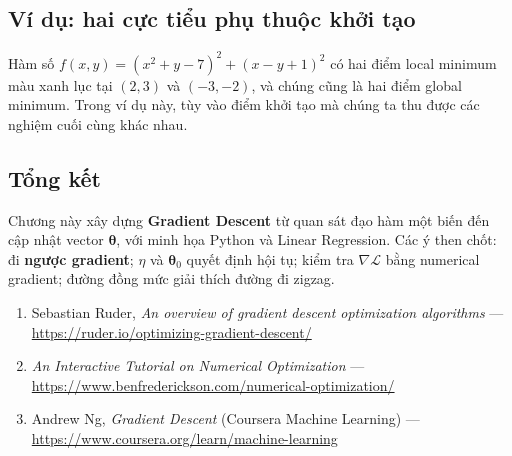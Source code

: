 \subsection{Ví dụ: hai cực tiểu phụ thuộc khởi tạo}

\begin{vidu}[title={Hàm $f(x,y) = (x^2 + y - 7)^2 + (x - y + 1)^2$}]
Hàm số $f(x, y) = (x^2 + y - 7)^2 + (x - y + 1)^2$ có hai điểm local minimum màu xanh lục tại $(2, 3)$ và $(-3, -2)$, và chúng cũng là hai điểm global minimum. Trong ví dụ này, tùy vào điểm khởi tạo mà chúng ta thu được các nghiệm cuối cùng khác nhau.

\end{vidu}

\subsection{Tổng kết}

\begin{tongket}[title={Tổng kết}]
Chương này xây dựng \textbf{Gradient Descent} từ quan sát đạo hàm một biến đến cập nhật vector $\boldsymbol{\theta}$, với minh họa Python và Linear Regression. Các ý then chốt: đi \textbf{ngược gradient}; $\eta$ và $\boldsymbol{\theta}_0$ quyết định hội tụ; kiểm tra $\nabla \mathcal{L}$ bằng numerical gradient; đường đồng mức giải thích đường đi zigzag.
\end{tongket}

\begin{phuongphap}[title={Tài liệu đọc thêm}]
\begin{enumerate}
 \item Sebastian Ruder, \emph{An overview of gradient descent optimization algorithms} --- \url{https://ruder.io/optimizing-gradient-descent/}
 \item \emph{An Interactive Tutorial on Numerical Optimization} --- \url{https://www.benfrederickson.com/numerical-optimization/}
 \item Andrew Ng, \emph{Gradient Descent} (Coursera Machine Learning) --- \url{https://www.coursera.org/learn/machine-learning}
\end{enumerate}
\end{phuongphap}
